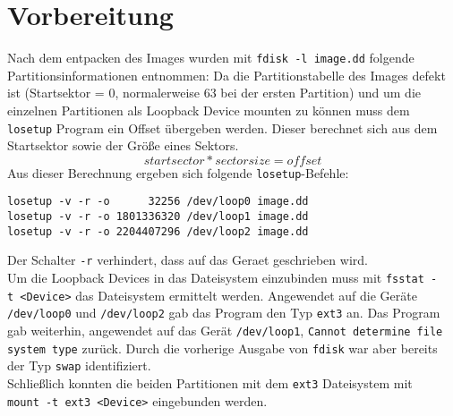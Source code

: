 \section{Vorbereitung}

Nach dem entpacken des Images wurden mit \texttt{fdisk~-l~image.dd} folgende Partitionsinformationen entnommen:
\lstset{basicstyle=\footnotesize}
Da die Partitionstabelle des Images defekt ist (Startsektor = 0, normalerweise 63 bei der ersten Partition) und um die einzelnen Partitionen als Loopback Device mounten zu können muss dem \texttt{losetup} Program ein Offset übergeben werden. Dieser berechnet sich aus dem Startsektor sowie der Größe eines Sektors.\[startsector*sectorsize=offset\]
Aus dieser Berechnung ergeben sich folgende \texttt{losetup}-Befehle:

\begin{verbatim}
losetup -v -r -o      32256 /dev/loop0 image.dd
losetup -v -r -o 1801336320 /dev/loop1 image.dd
losetup -v -r -o 2204407296 /dev/loop2 image.dd
\end{verbatim}
\noindent Der Schalter \texttt{-r} verhindert, dass auf das Geraet geschrieben wird.\\

Um die Loopback Devices in das Dateisystem einzubinden muss mit \texttt{fsstat~-t~<Device>} das Dateisystem ermittelt werden. Angewendet auf die Geräte \texttt{/dev/loop0} und \texttt{/dev/loop2} gab das Program den Typ \texttt{ext3} an. Das Program gab weiterhin, angewendet auf das Gerät \texttt{/dev/loop1}, \texttt{Cannot determine file system type} zurück. Durch die vorherige Ausgabe von \texttt{fdisk} war aber bereits der Typ \texttt{swap} identifiziert.\\

Schließlich konnten die beiden Partitionen mit dem \texttt{ext3} Dateisystem mit \texttt{mount~-t~ext3~<Device>} eingebunden werden.